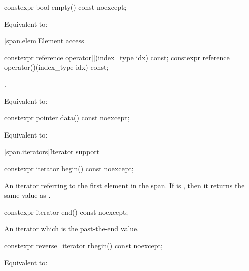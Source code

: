\begin{codeblock}
\begin{codeblock}
\begin{codeblock}
%
\begin{itemdecl}
constexpr bool empty() const noexcept;
\end{itemdecl}
\begin{itemdescr}
\pnum
\effects
Equivalent to: 
\end{itemdescr}

[span.elem]{Element access}

%
%
\begin{itemdecl}
constexpr reference operator[](index_type idx) const;
constexpr reference operator()(index_type idx) const;
\end{itemdecl}
\begin{itemdescr}
\pnum
\requires
{}.

\pnum
\effects
Equivalent to: 
\end{itemdescr}

%
\begin{itemdecl}
constexpr pointer data() const noexcept;
\end{itemdecl}
\begin{itemdescr}
\pnum
\effects
Equivalent to: 
\end{itemdescr}

[span.iterators]{Iterator support}

%
\begin{itemdecl}
constexpr iterator begin() const noexcept;
\end{itemdecl}
\begin{itemdescr}
\pnum
\returns
An iterator referring to the first element in the span.
If  is , then it returns the
same value as .
\end{itemdescr}

%
\begin{itemdecl}
constexpr iterator end() const noexcept;
\end{itemdecl}
\begin{itemdescr}
\pnum
\returns
An iterator which is the past-the-end value.
\end{itemdescr}

%
\begin{itemdecl}
constexpr reverse_iterator rbegin() const noexcept;
\end{itemdecl}
\begin{itemdescr}
\pnum
\effects
Equivalent to: 
\end{itemdescr}


\end{codeblock}
\end{codeblock}
\end{codeblock}
